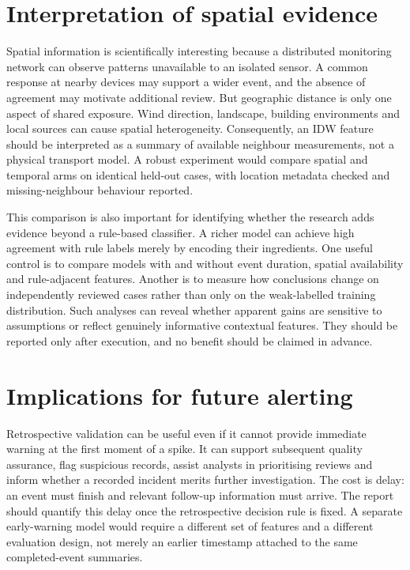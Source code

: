 \documentclass[12pt,a4paper,oneside]{report}
\begin{document}
\section{Interpretation of spatial evidence}
Spatial information is scientifically interesting because a distributed monitoring network can observe patterns unavailable to an isolated sensor. A common response at nearby devices may support a wider event, and the absence of agreement may motivate additional review. But geographic distance is only one aspect of shared exposure. Wind direction, landscape, building environments and local sources can cause spatial heterogeneity. Consequently, an IDW feature should be interpreted as a summary of available neighbour measurements, not a physical transport model. A robust experiment would compare spatial and temporal arms on identical held-out cases, with location metadata checked and missing-neighbour behaviour reported.

This comparison is also important for identifying whether the research adds evidence beyond a rule-based classifier. A richer model can achieve high agreement with rule labels merely by encoding their ingredients. One useful control is to compare models with and without event duration, spatial availability and rule-adjacent features. Another is to measure how conclusions change on independently reviewed cases rather than only on the weak-labelled training distribution. Such analyses can reveal whether apparent gains are sensitive to assumptions or reflect genuinely informative contextual features. They should be reported only after execution, and no benefit should be claimed in advance.

\section{Implications for future alerting}
Retrospective validation can be useful even if it cannot provide immediate warning at the first moment of a spike. It can support subsequent quality assurance, flag suspicious records, assist analysts in prioritising reviews and inform whether a recorded incident merits further investigation. The cost is delay: an event must finish and relevant follow-up information must arrive. The report should quantify this delay once the retrospective decision rule is fixed. A separate early-warning model would require a different set of features and a different evaluation design, not merely an earlier timestamp attached to the same completed-event summaries.
\end{document}
